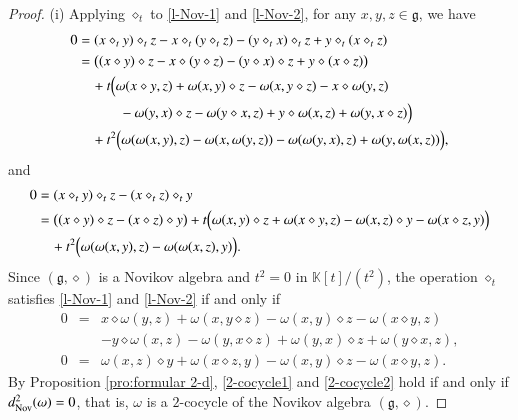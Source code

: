 \documentclass[12pt]{amsart}
\theoremstyle{definition}
\newcommand{\g}{\mathfrak g}
\newcommand{\nov}{{\rm Nov}}
\newcommand{\ome}{\omega}
\begin{document}
\begin{proof}
{\rm (i)} Applying $\diamond_t$ to \eqref{l-Nov-1} and \eqref{l-Nov-2}, for any $x,y,z\in\g$, we have
\begin{align*}
0&=(x\diamond_t y)\diamond_t z-x\diamond_t (y\diamond_t z)-(y\diamond_t x)\diamond_t z+y\diamond_t (x\diamond_t z)\\
&= \bigl((x\diamond y)\diamond z-x\diamond(y\diamond z)-(y\diamond x)\diamond z+y\diamond(x\diamond z)\bigr) \\
&\quad + t\Bigl(\omega(x\diamond y,z)+\omega(x,y)\diamond z-\omega(x,y\diamond z)-x\diamond\omega(y,z)\\
&\qquad\quad-\omega(y,x)\diamond z-\omega(y\diamond x,z)+y\diamond\omega(x,z)+\omega(y,x\diamond z)\Bigr) \\
&\quad + t^{2}\Bigl(\omega(\omega(x,y),z)-\omega(x,\omega(y,z))-\omega(\omega(y,x),z)+\omega(y,\omega(x,z))\Bigr),
\end{align*}
and
\begin{align*}
0&=(x\diamond_t y)\diamond_t z-(x\diamond_t z)\diamond_t y\\
&=\bigl((x\diamond y)\diamond z-(x\diamond z)\diamond y\bigr) + t\Bigl(\omega(x,y)\diamond z+\omega(x\diamond y,z)-\omega(x,z)\diamond y-\omega(x\diamond z,y)\Bigr) \\
&\quad + t^{2}\Bigl(\omega(\omega(x,y),z)-\omega(\omega(x,z),y)\Bigr).
\end{align*}
Since $(\g,\diamond)$ is a Novikov algebra and $t^2=0$ in $\mathds{K}[t]/(t^2)$, the operation $\diamond_t$ satisfies \eqref{l-Nov-1} and \eqref{l-Nov-2} if and only if
\begin{eqnarray}
	0&=&x\diamond\ome(y,z)+\ome(x,y\diamond z)-\ome(x,y)\diamond z-\ome(x\diamond y,z)\label{2-cocycle1}\\
	&&-y\diamond\ome(x,z)-\ome(y,x\diamond z)+\ome(y,x)\diamond z+\ome(y\diamond x,z),\nonumber\\
	0&=&\ome(x,z)\diamond y+\ome(x\diamond z,y)-\ome(x,y)\diamond z-\ome(x\diamond y,z).\label{2-cocycle2}
\end{eqnarray}
By Proposition \ref{pro:formular 2-d}, \eqref{2-cocycle1} and \eqref{2-cocycle2} hold if and only if $d_\nov^{2}(\ome)=0$, that is, $\ome$ is a $2$-cocycle of the Novikov algebra $(\g,\diamond)$.


\end{proof}
\end{document}
